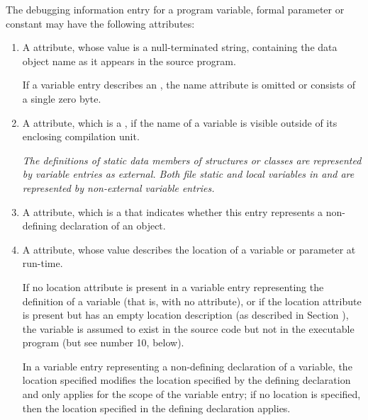 The debugging information entry for a program variable,
formal parameter or constant may have the following attributes:
\begin{enumerate}[1. ]
\item A \DWATname{} attribute,
whose value is a null-terminated
string, containing the data object name as it appears in the
source program.

If a variable entry describes an 
,
the name attribute is omitted or consists of a single
zero byte.

\item A \DWATexternal{} attribute, 
\hypertarget{chap:DWATexternalexternalvariable}{}
which 
is a , if the name
of a variable is visible outside of its enclosing compilation
unit.  

\textit{The definitions of  static data members of structures
or classes are represented by variable entries  as
external. Both file static and local variables in  and 
are represented by non-external variable entries.
}

\item A \DWATdeclaration{} attribute, 
which is a  that
indicates whether this entry represents a non-defining
declaration of an object.

\item A \DWATlocation{} attribute,
whose value describes the location of a variable or parameter at run-time.

If no location attribute is present in a variable 
entry representing the definition of a variable (that is,
with no 
\DWATdeclaration{} attribute),
or if the location attribute is present but has
an empty location description (as described in Section ),
the variable is assumed to exist in the source code but not
in the executable program (but see number 10, below).

In a variable entry representing a non-defining declaration of a variable, the location
specified modifies the location specified by the defining declaration and only applies for the
scope of the variable entry; if no location is specified, then the location specified in the
defining declaration applies.


\end{enumerate}
